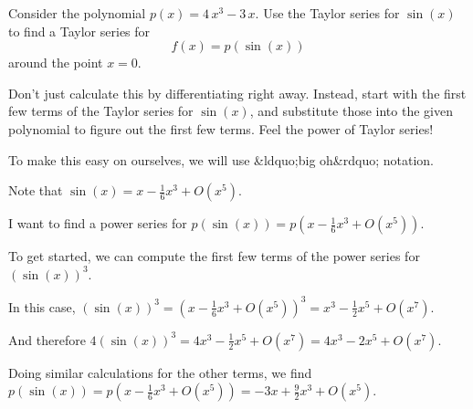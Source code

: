 \documentclass{ximera}
\begin{document}
            \begin{question}
              Consider the polynomial \(p(x) = 4 \, x^{3} - 3 \, x\).  Use the Taylor series for \(\sin\left(x\right)\) to find a Taylor series for \[f(x) = p(\sin\left(x\right))\] around the point \(x = 0\).

Don't just calculate this by differentiating right away.  Instead, start with the first few terms of the Taylor series for \(\sin\left(x\right)\), and substitute those into the given polynomial to figure out the first few terms.  Feel the power of Taylor series!

              \begin{solution}
                \begin{hint}
                  To make this easy on ourselves, we will use &ldquo;big oh&rdquo; notation.
                \end{hint}
                \begin{hint}
                  Note that \(\sin\left(x\right) = x - \displaystyle\frac{1}{6}x^{3} + O(x^{5})\).
                \end{hint}
                \begin{hint}
                  I want to find a power series for \(p(\sin\left(x\right)) = p\left(x - \displaystyle\frac{1}{6}x^{3} + O(x^{5})\right)\).
                \end{hint}
                \begin{hint}
                  To get started, we can compute the first few terms of the power series for \(\left(\sin\left(x\right)\right)^{3}\).
                \end{hint}
                \begin{hint}
                  In this case, \(\left(\sin\left(x\right)\right)^{3} = \left(x - \displaystyle\frac{1}{6}x^{3} + O(x^{5})\right)^{3} = x^{3} - \displaystyle\frac{1}{2}x^{5} + O(x^{7})\).
                \end{hint}
                \begin{hint}
                  And therefore \(4 \left(\sin\left(x\right)\right)^{3} = 4 x^{3} - \displaystyle\frac{1}{2}x^{5} + O(x^{7}) = 4x^{3} - 2x^{5} + O(x^{7})\).
                \end{hint}
                \begin{hint}
                  Doing similar calculations for the other terms, we find \(p(\sin\left(x\right)) = p\left(x - \displaystyle\frac{1}{6}x^{3} + O(x^{5})\right) = -3x + \displaystyle\frac{9}{2}x^{3} + O(x^{5})\).

\end{hint}
\end{solution}
\end{question}
\end{document}
